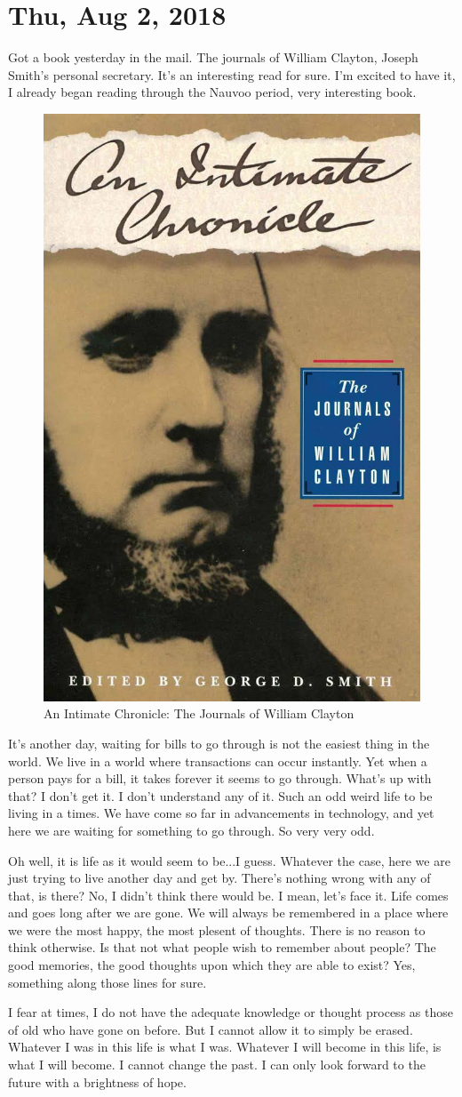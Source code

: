 \section{Thu, Aug 2, 2018}

Got a book yesterday in the mail. The journals of William Clayton, Joseph Smith's
personal secretary. It's an interesting read for sure. I'm excited to have it, I
already began reading through the Nauvoo period, very interesting book.

\begin{figure}[h!]
  \centering
  \includegraphics[width=0.5\linewidth]{2018/images/clayton.jpg}
  \caption{An Intimate Chronicle: The Journals of William Clayton}
  \label{fig:clayton}
\end{figure}

It's another day, waiting for bills to go through is not the easiest thing in the
world. We live in a world where transactions can occur instantly. Yet when a person
pays for a bill, it takes forever it seems to go through. What's up with that? I
don't get it. I don't understand any of it. Such an odd weird life to be living in a
times. We have come so far in advancements in technology, and yet here we are waiting
for something to go through. So very very odd.

Oh well, it is life as it would seem to be...I guess. Whatever the case, here we are
just trying to live another day and get by. There's nothing wrong with any of that,
is there? No, I didn't think there would be. I mean, let's face it. Life comes and
goes long after we are gone. We will always be remembered in a place where we were
the most happy, the most plesent of thoughts. There is no reason to think otherwise.
Is that not what people wish to remember about people? The good memories, the good
thoughts upon which they are able to exist? Yes, something along those lines for
sure.

I fear at times, I do not have the adequate knowledge or thought process as those of
old who have gone on before. But I cannot allow it to simply be erased. Whatever I
was in this life is what I was. Whatever I will become in this life, is what I will
become. I cannot change the past. I can only look forward to the future with a
brightness of hope.